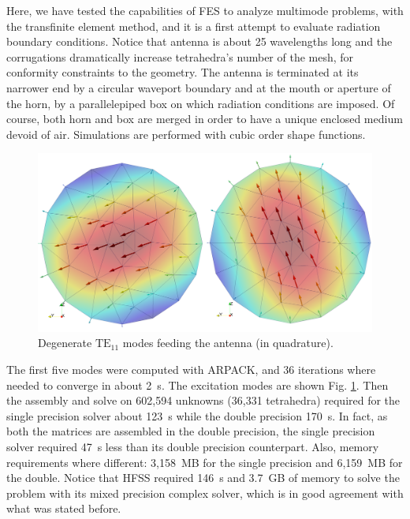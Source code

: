 Here, we have tested the capabilities of FES to analyze multimode problems, with the transfinite element method, and it is a first attempt to evaluate radiation boundary conditions. Notice that antenna is about 25 wavelengths long and the corrugations dramatically increase tetrahedra's number of the mesh, for conformity constraints to the geometry.  The antenna is terminated at its narrower end by a circular waveport boundary and at the mouth or aperture of the horn, by a parallelepiped box on which radiation conditions are imposed. Of course, both horn and box are merged in order to have a unique enclosed medium devoid of air. Simulations are performed with cubic order shape functions.

\begin{figure}[ht!]
\centering
\includegraphics[width=12cm]{Modes}
\caption{Degenerate $\mathrm{TE}_{11}$ modes feeding the antenna (in quadrature).}
\label{fig:Modes}
\end{figure}


The first five modes were computed with ARPACK, and 36 iterations where needed to converge in about 2~s. The excitation modes are shown Fig. \ref{fig:Modes}. Then the assembly and solve on 602,594 unknowns (36,331 tetrahedra) required for the single precision solver about 123~s while the double precision 170~s. In fact, as both the matrices are assembled in the double precision, the single precision solver required 47~s less than its double precision counterpart. Also, memory requirements where different: 3,158~MB for the single precision and 6,159~MB for the double. Notice that HFSS required 146~s and 3.7~GB of memory to solve the problem with its mixed precision complex solver, which is in good agreement with what was stated before.

